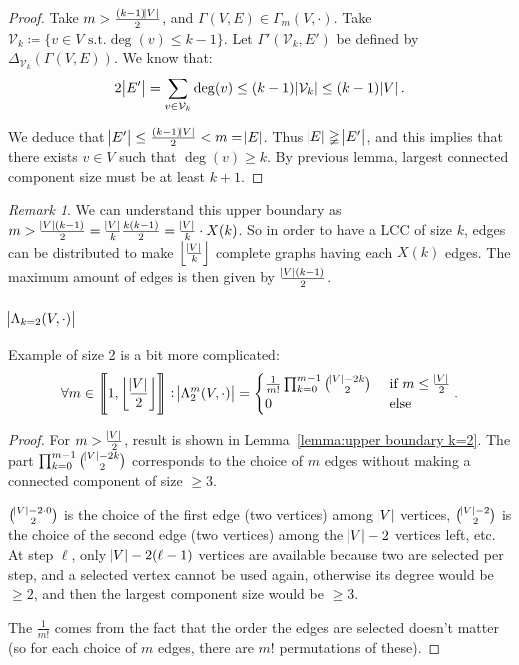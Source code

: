 \documentclass{article}
\theoremstyle{definition}
\theoremstyle{remark}
\newtheorem*{remark}{Remark}
\newcommand{\intint}[2]{\left\llbracket#1, #2\right\rrbracket}
\newcommand{\floor}[1]{\left\lfloor#1\right\rfloor}
\newcommand{\st}{\text{ s.t.}}
\begin{document}
			\begin{proof} Take $m > \frac {(k-1)\abs V}2$, and $\Gamma(V, E) \in \Gamma_m(V, \cdot)$. Take $\mathcal V_k \coloneqq \{v \in V \st \deg(v) \leq k-1\}$.
			Let $\Gamma'(\mathcal V_k, E')$ be defined by $\Delta_{\mathcal V_k}(\Gamma(V, E))$. We know that:
			\[2\abs {E'} = \sum_{v \in \mathcal V_k}\deg(v) \leq (k-1)\abs {\mathcal V_k} \leq (k-1)\abs V.\]

			We deduce that $\abs {E'} \leq \frac {(k-1)\abs V}2 < m = \abs E$. Thus $\abs E \gneqq \abs {E'}$, and this implies that there exists $v \in V$ such that $\deg(v) \geq k$.
			By previous lemma, largest connected component size must be at least $k+1$.
			\end{proof}

			\begin{remark} We can understand this upper boundary as $m > \frac {\abs V(k-1)}2 = \frac {\abs V}k\frac {k(k-1)}2 = \frac {\abs V}k \cdot X(k)$. So in
			order to have a LCC of size $k$, edges can be distributed to make $\floor {\frac {\abs V}k}$ complete graphs having each $X(k)$ edges.
			The maximum amount of edges is then given by $\frac {\abs V(k-1)}2$.
			\end{remark}

		\subsubsection{$\abs {\Lambda_{k=2}(V, \cdot)}$}
			Example of size 2 is a bit more complicated:
			\[\forall m \in \intint 1{\floor {\frac {\abs V}2}} : \abs {\Lambda_2^m(V, \cdot)} = \begin{cases}
				\frac 1{m!}\prod_{k=0}^{m-1}\binom {\abs V-2k}2 &\text{ if } m \leq \frac {\abs V}2 \\
				0 &\text{ else}
			\end{cases}.\]

			\begin{proof} For $m > \frac {\abs V}2$, result is shown in Lemma~\ref{lemma:upper boundary k=2}. The part $\prod_{k=0}^{m-1}\binom {\abs V-2k}2$ corresponds
			to the choice of $m$ edges without making a connected component of size $\geq 3$.

			$\binom {\abs V-2 \cdot 0}2$ is the choice of the first edge (two vertices) among $\abs V$ vertices, $\binom {\abs V-2}2$ is the choice of the second edge
			(two vertices) among the $\abs V-2$ vertices left, etc. At step $\ell$, only $\abs V-2(\ell-1)$ vertices are available because two are selected per step, and
			a selected vertex cannot be used again, otherwise its degree would be $\geq 2$, and then the largest component size would be $\geq 3$.

			The $\frac 1{m!}$ comes from the fact that the order the edges are selected doesn't matter (so for each choice of $m$ edges, there are $m!$ permutations
			of these).
			\end{proof}
\end{document}
